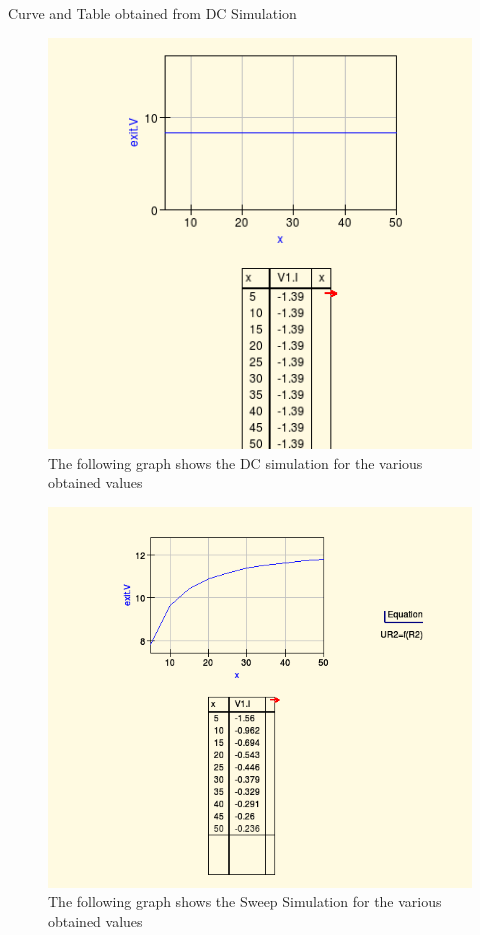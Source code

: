 \documentclass{report}
\begin{document}
 

Curve and Table obtained from DC Simulation

 
\begin{figure}[hbt!]
 \centering
 \caption{The following graph shows the DC simulation for the various obtained values}
\includegraphics[width=\textwidth]{06.png}
 \end{figure}

\begin{figure}[hbt!]
 \centering
  \caption{The following graph shows the Sweep Simulation for the various obtained values}
\includegraphics[width=\textwidth]{04.png}

\end{figure}
\end{document}
